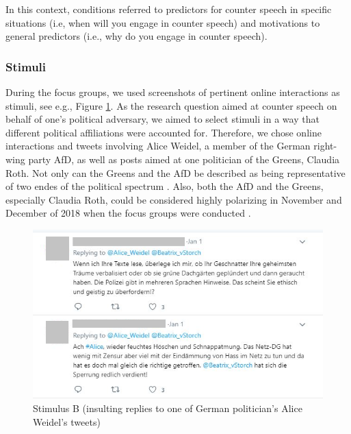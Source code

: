 \documentclass[runningheads]{llncs}
\begin{document}
In this context, conditions referred to predictors for counter speech in specific situations (i.e, when will you engage in counter speech) and motivations to general predictors (i.e., why do you engage in counter speech).

\hypertarget{stimuli}{%
\subsubsection{Stimuli}\label{stimuli}}

During the focus groups, we used screenshots of pertinent online interactions as stimuli, see e.g., Figure \ref{fig:stimulus-b}. As the research question aimed at counter speech on behalf of one's political adversary, we aimed to select stimuli in a way that different political affiliations were accounted for. Therefore, we chose online interactions and tweets involving Alice Weidel, a member of the German right-wing party AfD, as well as posts aimed at one politician of the Greens, Claudia Roth. Not only can the Greens and the AfD be described as being representative of two endes of the political spectrum \autocite{leesAlternativeGermanyRise2018,hambauerWerWaehltAfD2018,maderEuropeanRefugeeCrisis2019}.
Also, both the AfD and the Greens, especially Claudia Roth, could be considered highly polarizing in November and December of 2018 when the focus groups were conducted \autocite{gensingGruenenPolitikerinRothIm2018,VolksverhetzungHunderteAnzeigen2018}.

\begin{figure}

{\centering \includegraphics[width=1\linewidth]{../images/stimulus2} 

}

\caption{Stimulus B (insulting replies to one of German politician's Alice Weidel's tweets)}\label{fig:stimulus-b}
\end{figure}
\end{document}
